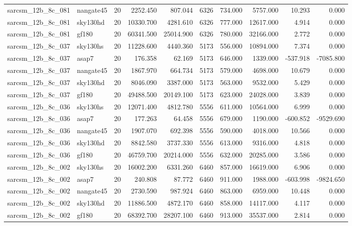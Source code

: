 \begin{tabular}{llrrrrrrrr}
sarcsm\_12b\_8c\_081 & nangate45 & 20 & 2252.450 & 807.044 & 6326 & 734.000 & 5757.000 & 10.293 & 0.000 \\
sarcsm\_12b\_8c\_081 & sky130hd & 20 & 10330.700 & 4281.610 & 6326 & 777.000 & 12617.000 & 4.914 & 0.000 \\
sarcsm\_12b\_8c\_081 & gf180 & 20 & 60341.500 & 25014.900 & 6326 & 780.000 & 32166.000 & 2.772 & 0.000 \\
sarcsm\_12b\_8c\_037 & sky130hs & 20 & 11228.600 & 4440.360 & 5173 & 556.000 & 10894.000 & 7.374 & 0.000 \\
sarcsm\_12b\_8c\_037 & asap7 & 20 & 176.358 & 62.169 & 5173 & 646.000 & 1339.000 & -537.918 & -7085.800 \\
sarcsm\_12b\_8c\_037 & nangate45 & 20 & 1867.970 & 664.734 & 5173 & 579.000 & 4698.000 & 10.679 & 0.000 \\
sarcsm\_12b\_8c\_037 & sky130hd & 20 & 8046.090 & 3387.000 & 5173 & 563.000 & 9532.000 & 5.429 & 0.000 \\
sarcsm\_12b\_8c\_037 & gf180 & 20 & 49488.500 & 20149.100 & 5173 & 623.000 & 24028.000 & 3.839 & 0.000 \\
sarcsm\_12b\_8c\_036 & sky130hs & 20 & 12071.400 & 4812.780 & 5556 & 611.000 & 10564.000 & 6.999 & 0.000 \\
sarcsm\_12b\_8c\_036 & asap7 & 20 & 177.263 & 64.458 & 5556 & 679.000 & 1190.000 & -600.852 & -9529.690 \\
sarcsm\_12b\_8c\_036 & nangate45 & 20 & 1907.070 & 692.398 & 5556 & 590.000 & 4018.000 & 10.566 & 0.000 \\
sarcsm\_12b\_8c\_036 & sky130hd & 20 & 8842.580 & 3737.330 & 5556 & 613.000 & 9316.000 & 4.818 & 0.000 \\
sarcsm\_12b\_8c\_036 & gf180 & 20 & 46759.700 & 20214.000 & 5556 & 632.000 & 20285.000 & 3.586 & 0.000 \\
sarcsm\_12b\_8c\_002 & sky130hs & 20 & 16002.200 & 6331.260 & 6460 & 857.000 & 16619.000 & 6.906 & 0.000 \\
sarcsm\_12b\_8c\_002 & asap7 & 20 & 240.808 & 87.772 & 6460 & 911.000 & 1988.000 & -603.998 & -9824.650 \\
sarcsm\_12b\_8c\_002 & nangate45 & 20 & 2730.590 & 987.924 & 6460 & 863.000 & 6959.000 & 10.448 & 0.000 \\
sarcsm\_12b\_8c\_002 & sky130hd & 20 & 11886.500 & 4872.170 & 6460 & 858.000 & 14117.000 & 4.117 & 0.000 \\
sarcsm\_12b\_8c\_002 & gf180 & 20 & 68392.700 & 28207.100 & 6460 & 913.000 & 35537.000 & 2.814 & 0.000 \\

\end{tabular}
